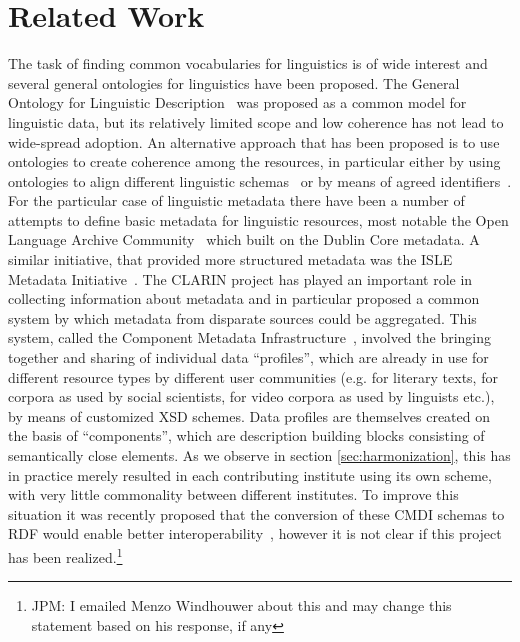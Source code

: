 \documentclass{llncs}
\begin{document}
\section{Related Work}

\label{sec:relatedwork}

The task of finding common vocabularies for linguistics is of wide interest and
several general ontologies for linguistics have been proposed. The General
Ontology for Linguistic Description~\cite[GOLD]{farrar2002common} was proposed
as a common model for linguistic data, but its relatively limited scope and low
coherence has not lead to wide-spread adoption. An alternative approach that has
been proposed is to use ontologies to create coherence among the resources, in
particular either by using ontologies to align different linguistic
schemas~\cite{chiarcos2012ontologies} or by means of agreed
identifiers~\cite{kemps2008isocat}. For the particular case of linguistic
metadata there have been a number of attempts to define basic metadata for
linguistic resources, most notable the Open Language Archive
Community~\cite[OLAC]{bird2001olac} which built on the Dublin Core metadata. A
similar initiative, that provided more structured metadata was the ISLE Metadata
Initiative~\cite[IMDI]{broeder2001imdi}.
The CLARIN project has played an important role in collecting information about
metadata and in particular proposed a common system by which metadata from
disparate sources could be aggregated. This system, called the Component
Metadata Infrastructure~\cite{broeder2012cmdi}, involved the bringing together and sharing of
individual data ``profiles'', which are already in use for different resource
types by different user communities (e.g. for literary texts, for corpora as
used by social scientists, for video corpora as used by linguists etc.), by
means of customized XSD schemes. Data profiles are themselves created on the
basis of ``components'', which are description building blocks consisting of semantically close elements.
As we observe in section \ref{sec:harmonization}, this has in practice merely
resulted in each contributing institute using its own scheme, with very little
commonality between different institutes. To improve this situation it was
recently proposed that the conversion of these CMDI schemas to RDF would enable
better interoperability~\cite{durco2014clarin}, however it is not clear if this
project has been realized.\footnote{JPM: I emailed Menzo Windhouwer about this
and may change this statement based on his response, if any}
\end{document}

